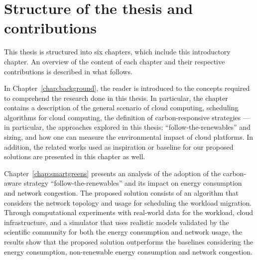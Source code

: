 \section{Structure of the thesis and contributions}

This thesis is structured into six chapters, which include this introductory chapter. An overview of the content of each chapter and their respective contributions is described in what follows.

In Chapter~\ref{chap:background}, the reader is introduced to the concepts required to comprehend the research done in this thesis. In particular, the chapter contains a description of the general scenario of cloud computing, scheduling algorithms for cloud computing, the definition of carbon-responsive strategies --- in particular, the approaches explored in this thesis: ``follow-the-renewables'' and sizing, and how one can measure the environmental impact of cloud platforms. In addition, the related works used as inspiration or baseline for our proposed solutions are presented in this chapter as well.

Chapter~\ref{chap:smartgreens} presents an analysis of the adoption of the carbon-aware strategy ``follow-the-renewables'' and its impact on energy consumption and network congestion. The proposed solution consists of an algorithm that considers the network topology and usage for scheduling the workload migration. Through computational experiments with real-world data for the workload, cloud infrastructure, and a simulator that uses realistic models validated by the scientific community for both the energy consumption and network usage, the results show that the proposed solution outperforms the baselines considering the energy consumption, non-renewable energy consumption and network congestion. 

